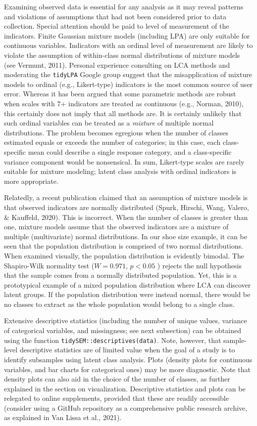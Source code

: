 \documentclass[
  ,man,floatsintext]{apa6}
\begin{document}
Examining observed data is essential for any analysis
as it may reveal patterns and violations of assumptions
that had not been considered prior to data collection.
Special attention should be paid
to level of measurement of the indicators.
Finite Gaussian mixture models (including LPA)
are only suitable for continuous variables.
Indicators with an ordinal level of measurement
are likely to violate the assumption of
within-class normal distributions of mixture models
(see Vermunt, 2011).
Personal experience consulting on LCA methods and
moderating the \texttt{tidyLPA} Google group
suggest that the misapplication of mixture models
to ordinal (e.g., Likert-type) indicators
is the most common source of user error.
Whereas it has been argued that some parametric methods are robust
when scales with 7+ indicators are treated as continuous
(e.g., Norman, 2010),
this certainly does not imply that all methods are.
It is certainly unlikely that such ordinal variables
can be treated as a \emph{mixture} of multiple normal distributions.
The problem becomes egregious when
the number of classes estimated equals or exceeds the number of categories;
in this case, each class-specific mean could describe a single response category,
and a class-specific variance component would be nonsensical.
In sum, Likert-type scales are rarely suitable for mixture modeling;
latent class analysis with ordinal indicators is more appropriate.

Relatedly, a recent publication claimed that
an assumption of mixture models is that
observed indicators are normally distributed (Spurk, Hirschi, Wang, Valero, \& Kauffeld, 2020).
This is incorrect.
When the number of classes is greater than one,
mixture models assume that the observed indicators
are a mixture of multiple (multivariate) normal distributions.
In our shoe size example, it can be seen that the population distribution
is comprised of two normal distributions.
When examined visually, the population distribution is evidently bimodal.
The Shapiro-Wilk normality test (\(W = 0.971\), \(p < 0.05\) )
rejects the null hypothesis that
the sample comes from a normally distributed population.
Yet, this is a prototypical example of a mixed population distribution
where LCA can discover latent groups.
If the population distribution were instead normal,
there would be no classes to extract
as the whole population would belong to a single class.

Extensive descriptive statistics
(including the number of unique values,
variance of categorical variables, and missingness; see next subsection)
can be obtained using the function \texttt{tidySEM::descriptives(data)}.
Note, however, that sample-level descriptive statistics
are of limited value when the goal of a study is
to identify subsamples using latent class analysis.
Plots (density plots for continuous variables,
and bar charts for categorical ones) may be more diagnostic.
Note that density plots can also aid in the choice of the number of classes,
as further explained in the section on visualization.
Descriptive statistics and plots can be relegated to online supplements,
provided that these are readily accessible
(consider using a GitHub repository as a comprehensive public research archive,
as explained in Van Lissa et al., 2021).
\end{document}
